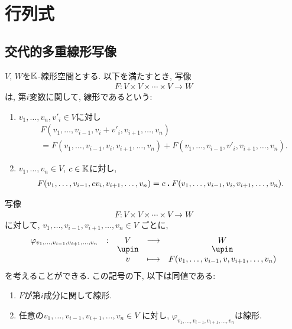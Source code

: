 \begin{quiz}
\end{quiz}




\chapter{行列式}
\section{交代的多重線形写像}

\begin{definition}
  $V$, $W$を$\mathbb{K}$-線形空間とする.
  以下を満たすとき,
  写像
  \begin{align*}
    F\colon V\times V\times \cdots \times V\to W
  \end{align*}
  は,
  第$i$変数に関して, 
  線形であるという:
  \begin{enumerate}
  \item $v_1,\ldots,v_n,v'_i\in V$に対し
    \begin{align*}
      &F(v_1,\ldots,v_{i-1},v_i+v'_i,v_{i+1},\ldots,v_n)\\&=F(v_1,\ldots,v_{i-1},v_i,v_{i+1},\ldots,v_n)+F(v_1,\ldots,v_{i-1},v'_i,v_{i+1},\ldots,v_n).
    \end{align*}
  \item $v_1,\ldots,v_n\in V$, $c\in\mathbb{K}$に対し,
    \begin{align*}
      F(v_1,\ldots,v_{i-1},cv_i,v_{i+1},\ldots,v_n)=c\mathbin{\boldsymbol{.}} F(v_1,\ldots,v_{i-1},v_i,v_{i+1},\ldots,v_n).
    \end{align*}
  \end{enumerate}
\end{definition}
\begin{remark}
  写像
  \begin{align*}
    F\colon V\times V\times \cdots \times V\to W
  \end{align*}
  に対して,
  $v_1,\ldots,v_{i-1},v_{i+1},\ldots,v_n\in V$
  ごとに,
  \begin{align*}
    \shazo{\varphi_{v_1,\ldots,v_{i-1},v_{i+1},\ldots,v_n}}{V}{W}
    {v}{F(v_1,\ldots,v_{i-1},v,v_{i+1},\ldots,v_n)}
  \end{align*}
  を考えることができる.
  この記号の下, 以下は同値である:
  \begin{enumerate}
  \item $F$が第$i$成分に関して線形.
  \item 任意の$v_1,\ldots,v_{i-1},v_{i+1},\ldots,v_n\in V$
    に対し, $\varphi_{v_1,\ldots,v_{i-1},v_{i+1},\ldots,v_n}$は線形.
  \end{enumerate}
\end{remark}
